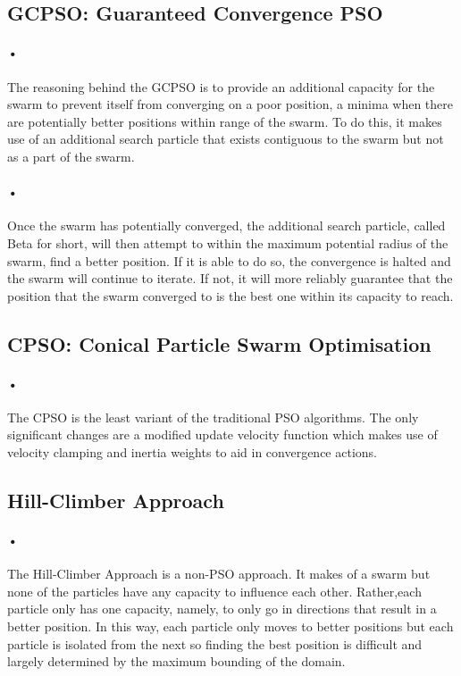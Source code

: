 \documentclass[11pt]{article}
\begin{document}
\subsection{GCPSO: Guaranteed Convergence PSO}
\paragraph{•}
The reasoning behind the GCPSO is to provide an additional capacity for the swarm to prevent itself from converging on a poor position, a minima when there are potentially better positions within range of the swarm. To do this, it makes use of an additional search particle that exists contiguous to the swarm but not as a part of the swarm.
\paragraph{•}
Once the swarm has potentially converged, the additional search particle, called Beta for short, will then attempt to within the maximum potential radius of the swarm, find a better position. If it is able to do so, the convergence is halted and the swarm will continue to iterate. If not, it will more reliably guarantee that the position that the swarm converged to is the best one within its capacity to reach.
\subsection{CPSO: Conical Particle Swarm Optimisation}
\paragraph{•}
The CPSO is the least variant of the traditional PSO algorithms. The only significant changes are a modified update velocity function which makes use of velocity clamping and inertia weights to aid in convergence actions.
\subsection{Hill-Climber Approach}
\paragraph{•}
The Hill-Climber Approach is a non-PSO approach. It makes of a swarm but none of the particles have any capacity to influence each other. Rather,each particle only has one capacity, namely, to only go in directions that result in a better position. In this way, each particle only moves to better positions but each particle is isolated from the next so finding the best position is difficult and largely determined by the maximum bounding of the domain.
\end{document}

